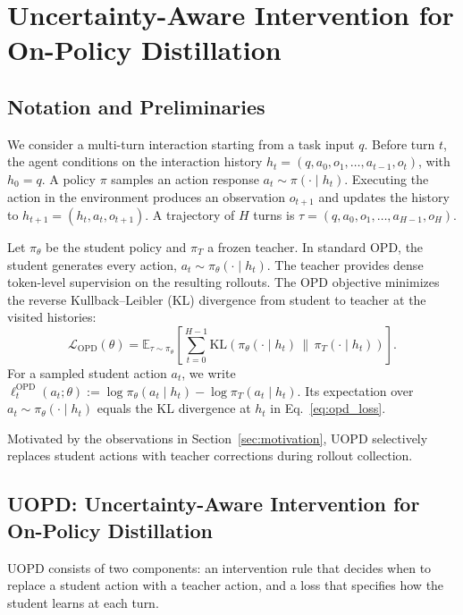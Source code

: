\section{Uncertainty-Aware Intervention for On-Policy Distillation}
\label{sec:method}

\subsection{Notation and Preliminaries}
\label{subsec:preliminary}

We consider a multi-turn interaction starting from a task input $q$. Before turn $t$, the agent conditions on the interaction history $h_t=(q,a_0,o_1,\ldots,a_{t-1},o_t)$, with $h_0=q$. A policy $\pi$ samples an action response $a_t\sim\pi(\cdot\mid h_t)$. Executing the action in the environment produces an observation $o_{t+1}$ and updates the history to $h_{t+1}=(h_t,a_t,o_{t+1})$. A trajectory of $H$ turns is $\tau=(q,a_0,o_1,\ldots,a_{H-1},o_H)$.

Let $\pi_\theta$ be the student policy and $\pi_T$ a frozen teacher. In standard OPD, the student generates every action, $a_t\sim\pi_\theta(\cdot\mid h_t)$. The teacher provides dense token-level supervision on the resulting rollouts. The OPD objective minimizes the reverse Kullback--Leibler (KL) divergence from student to teacher at the visited histories:
\begin{equation}
\mathcal L_{\mathrm{OPD}}(\theta)
=\mathbb E_{\tau\sim\pi_\theta}\!\left[
\sum_{t=0}^{H-1}
\mathrm{KL}\!\left(
\pi_\theta(\cdot\mid h_t)
\,\middle\|\,
\pi_T(\cdot\mid h_t)
\right)
\right].
\label{eq:opd_loss}
\end{equation}
For a sampled student action $a_t$, we write $\ell_t^{\mathrm{OPD}}(a_t;\theta):=\log\pi_\theta(a_t\mid h_t)-\log\pi_T(a_t\mid h_t)$. Its expectation over $a_t\sim\pi_\theta(\cdot\mid h_t)$ equals the KL divergence at $h_t$ in Eq.~\ref{eq:opd_loss}.

Motivated by the observations in Section~\ref{sec:motivation}, UOPD selectively replaces student actions with teacher corrections during rollout collection.

\subsection{UOPD: Uncertainty-Aware Intervention for On-Policy Distillation}
\label{subsec:said}

UOPD consists of two components: an intervention rule that decides when to replace a student action with a teacher action, and a loss that specifies how the student learns at each turn.

